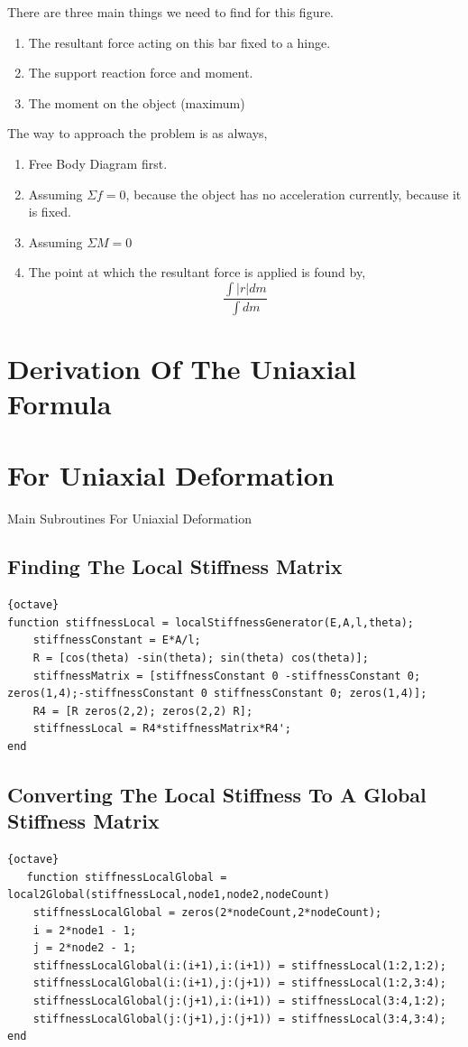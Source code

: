 \documentclass{report}
\begin{document}
There are three main things we need to find for this figure. 
\begin{enumerate}
  \item The resultant force acting on this bar fixed to a hinge. 
  \item The support reaction force and moment.
  \item The moment on the object (maximum)
\end{enumerate}
The way to approach the problem is as always,
\begin{enumerate}
  \item Free Body Diagram first. 
  \item Assuming $\Sigma f = 0 $, because the object has no acceleration currently, because it is fixed.
  \item Assuming $\Sigma M = 0$
  \item The point at which the resultant force is applied is found by, 
    \[
      \frac{\int |r|dm}{\int dm}
    \]
\end{enumerate}
\section{Derivation Of The Uniaxial Formula}
\section{For Uniaxial Deformation} %


\label{sec:for_uniaxial_deformation}
Main Subroutines For Uniaxial Deformation
\subsection{Finding The Local Stiffness Matrix} %
\begin{lstlisting}{octave}
function stiffnessLocal = localStiffnessGenerator(E,A,l,theta);
    stiffnessConstant = E*A/l;
    R = [cos(theta) -sin(theta); sin(theta) cos(theta)];
    stiffnessMatrix = [stiffnessConstant 0 -stiffnessConstant 0; zeros(1,4);-stiffnessConstant 0 stiffnessConstant 0; zeros(1,4)];
    R4 = [R zeros(2,2); zeros(2,2) R];
    stiffnessLocal = R4*stiffnessMatrix*R4';
end
\end{lstlisting}
\label{sec:finding_the_local_stiffness_matrix}
\subsection{Converting The Local Stiffness To A Global Stiffness Matrix}
\begin{lstlisting}{octave}
   function stiffnessLocalGlobal = local2Global(stiffnessLocal,node1,node2,nodeCount)
    stiffnessLocalGlobal = zeros(2*nodeCount,2*nodeCount);
    i = 2*node1 - 1;
    j = 2*node2 - 1;
    stiffnessLocalGlobal(i:(i+1),i:(i+1)) = stiffnessLocal(1:2,1:2);
    stiffnessLocalGlobal(i:(i+1),j:(j+1)) = stiffnessLocal(1:2,3:4);
    stiffnessLocalGlobal(j:(j+1),i:(i+1)) = stiffnessLocal(3:4,1:2);
    stiffnessLocalGlobal(j:(j+1),j:(j+1)) = stiffnessLocal(3:4,3:4);
end
\end{lstlisting}
\end{document}

